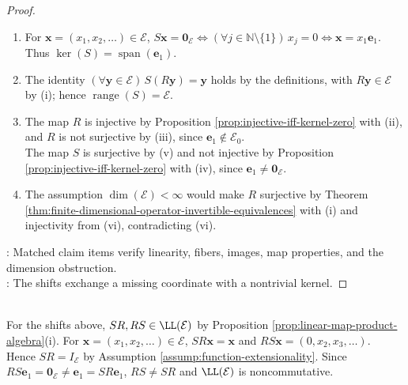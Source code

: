 \begin{proposition}
\begin{proof}
\begin{enumerate}[label=(\roman*)]
\item For $\mathbf{x}=(x_1,x_2,\ldots)\in\mathcal{E}$, $S\mathbf{x}=\mathbf{0}_{\mathcal{E}}\Longleftrightarrow(\forall j\in\mathbb{N}\setminus\{1\})\,x_j=0\Longleftrightarrow\mathbf{x}=x_1\mathbf{e}_1$. Thus $\ker(S)=\operatorname{span}(\mathbf{e}_1)$.
\item The identity $(\forall\mathbf{y}\in\mathcal{E})\,S(R\mathbf{y})=\mathbf{y}$ holds by the definitions, with $R\mathbf{y}\in\mathcal{E}$ by (i); hence $\operatorname{range}(S)=\mathcal{E}$.
\item The map $R$ is injective by Proposition \ref{prop:injective-iff-kernel-zero} with (ii), and $R$ is not surjective by (iii), since $\mathbf{e}_1\notin\mathcal{E}_0$.\\
The map $S$ is surjective by (v) and not injective by Proposition \ref{prop:injective-iff-kernel-zero} with (iv), since $\mathbf{e}_1\neq\mathbf{0}_{\mathcal{E}}$.
\item The assumption $\dim(\mathcal{E})<\infty$ would make $R$ surjective by Theorem \ref{thm:finite-dimensional-operator-invertible-equivalences} with (i) and injectivity from (vi), contradicting (vi).
\end{enumerate}
: Matched claim items verify linearity, fibers, images, map properties, and the dimension obstruction.\\
: The shifts exchange a missing coordinate with a nontrivial kernel.
\end{proof}
\end{proposition}

\begin{example} \label{ex:shift-operators-show-operator-algebra-noncommutative} \\
For the shifts above, $SR,RS\in\LL(\mathcal{E})$ by Proposition \ref{prop:linear-map-product-algebra}(i). For $\mathbf{x}=(x_1,x_2,\ldots)\in\mathcal{E}$, $SR\mathbf{x}=\mathbf{x}$ and $RS\mathbf{x}=(0,x_2,x_3,\ldots)$.\\
Hence $SR=I_{\mathcal{E}}$ by Assumption \ref{assump:function-extensionality}. Since $RS\mathbf{e}_1=\mathbf{0}_{\mathcal{E}}\neq\mathbf{e}_1=SR\mathbf{e}_1$, $RS\neq SR$ and $\LL(\mathcal{E})$ is noncommutative.
\end{example}
